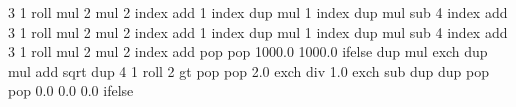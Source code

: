 {{  3 1 roll
  mul 2 mul       %
  2 index add     %
  1 index dup mul %
  1 index dup mul %
  sub             %
  4 index add     %
  3 1 roll
  mul 2 mul       %
  2 index add     %
  1 index dup mul %
  1 index dup mul %
  sub             %
  4 index add     %
  3 1 roll
  mul 2 mul       %
  2 index add     %
  } { pop pop 1000.0 1000.0 } ifelse
  dup mul exch
  dup mul
  add sqrt
  dup 4 1 roll
  2 gt { pop pop 2.0 exch div 1.0 exch sub dup dup} {pop pop 0.0 0.0 0.0} ifelse
}%
